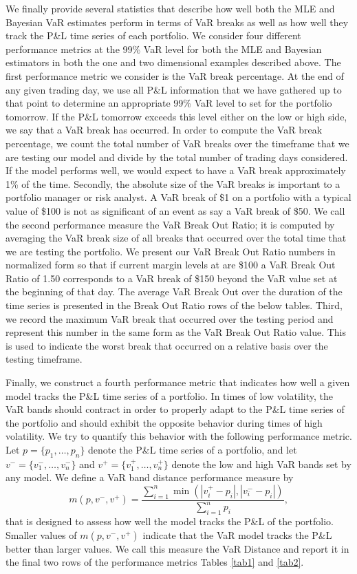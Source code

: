 \documentclass{amsart}
\begin{document}
We finally provide several statistics that describe how well both the MLE and Bayesian VaR estimates 
perform in 
terms of VaR breaks as well as how well they track the P\&L time series of each portfolio.  We 
consider four different performance metrics at the 99\% VaR level for both the MLE and Bayesian 
estimators in both the one and two dimensional examples described above. 
The first performance metric we consider is the VaR break percentage.  At the end of any 
given trading day, we use all P\&L information that we have gathered up to that point to 
determine an appropriate 99\% VaR level to set for the portfolio tomorrow.  If the P\&L 
tomorrow exceeds this level either on the low or high side, we say that a VaR break has occurred.
In order to compute the VaR break percentage, we count the total number of VaR breaks over the 
timeframe that we are testing our model and divide by the total number of trading days considered. 
If the model performs well, we would expect to have a VaR break approximately 1\% of the time.
Secondly, the absolute size of the VaR breaks is important to a portfolio manager or risk analyst.
A VaR break of \$1 on a portfolio with a typical value of \$100 is not as significant of an 
event as say a VaR break of \$50.  We call the second performance measure the VaR Break 
Out Ratio; it is computed by averaging the VaR break size of all breaks that occurred 
over the total time that we are testing the portfolio. 
We present our VaR Break Out Ratio numbers in normalized form so that if current margin levels 
at are \$100 a VaR Break Out Ratio of 1.50 corresponds to a VaR break of \$150 beyond the VaR value set at 
the beginning of that day.  The average VaR Break Out over the duration of the time series is 
presented in the Break Out Ratio rows of the below tables.  Third, we record the maximum VaR 
break that occurred over the testing period and represent this number in the same 
form as the VaR Break Out Ratio value.  This is used to indicate the worst break that occurred 
on a relative basis over the testing timeframe.  

Finally, we construct 
a fourth performance metric that indicates how well a given model tracks the P\&L time series 
of a portfolio.  In times of low volatility, the VaR bands should contract in order to 
properly adapt to the P\&L time series of the portfolio and should exhibit the opposite behavior 
during times of high volatility.  We try to quantify this behavior with the following performance 
metric.  Let $p=\{p_1,\ldots,p_n\}$ denote the P\&L time series of a portfolio, and 
let $v^-=\{v_1^-,\ldots,v_n^-\}$ and $v^+=\{v_1^+,\ldots,v_n^+\}$ denote the low and high 
VaR bands set by any model.  We define a VaR band distance performance measure by   
%
\begin{equation}
    m(p,v^-,v^+)  = \frac{\sum_{i=1}^n \min\left(|v_i^+-p_i| ,|v_i^--p_i|\right)}{\sum_{i=1}^n p_i},
\end{equation}
%
that is designed to assess how well the model tracks the P\&L of the portfolio. Smaller 
values of $m(p,v^-,v^+)$ indicate that the VaR model tracks the  P\&L better than 
larger values. We call this measure the VaR Distance and report it in the final two rows  
of the performance metrics Tables \ref{tab1} and \ref{tab2}. 
%
\end{document}
